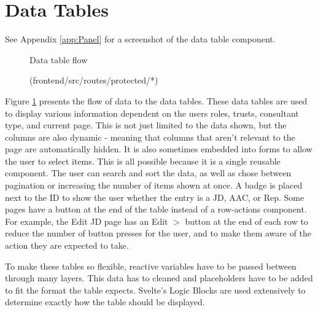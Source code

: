 \section{Data Tables} \label{Data Tables}
\vspace{-5pt}
{\footnotesize See Appendix \ref{app:Panel} for a screenshot of the data table component.}
\vspace{-5pt}
\begin{figure}[h]
\centering
{}
\vspace{-15pt}
\caption{Data table flow}
\vspace{-10pt}
\caption*{(frontend/src/routes/protected/*)}
\label{fig:data-table-flow}
\end{figure}

Figure \ref{fig:data-table-flow} presents the flow of data to the data tables. These data tables are used to display various information dependent on the users roles, trusts, consultant type, and current page. This is not just limited to the data shown, but the columns are also dynamic - meaning that columns that aren't relevant to the page are automatically hidden. It is also sometimes embedded into forms to allow the user to select items. This is all possible because it is a single reusable component. The user can search and sort the data, as well as chose between pagination or increasing the number of items shown at once. A badge is placed next to the ID to show the user whether the entry is a JD, AAC, or Rep. Some pages have a button at the end of the table instead of a row-actions component. For example, the Edit JD page has an Edit $>$ button at the end of each row to reduce the number of button presses for the user, and to make them aware of the action they are expected to take.

To make these tables so flexible, reactive variables have to be passed between through many layers. This data has to cleaned and placeholders have to be added to fit the format the table expects. Svelte's Logic Blocks are used extensively to determine exactly how the table should be displayed.

